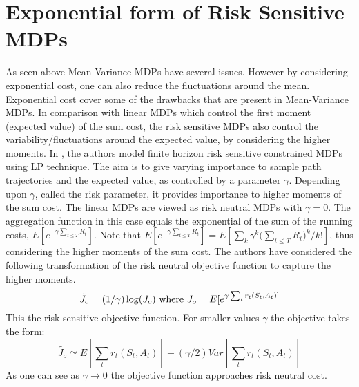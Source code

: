 \documentclass[11pt,a4paper,oneside]{report}
\begin{document}
\section{Exponential form of Risk Sensitive MDPs}
As seen above Mean-Variance MDPs have several issues. However by considering exponential cost, one can also reduce the fluctuations around the mean. Exponential cost cover some of the drawbacks that are present in Mean-Variance MDPs.
In comparison with linear MDPs which control the first moment (expected value) of the sum cost, the risk sensitive MDPs also control the variability/fluctuations around the expected value, by considering the higher moments. In \cite{kumar2015finite}, the authors model finite horizon risk sensitive constrained MDPs using LP technique.  The aim is to give varying importance to sample path trajectories and the expected value, as controlled by a parameter $\gamma$. Depending upon $\gamma$, called the risk parameter, it provides importance to higher moments of the sum cost. The linear MDPs are viewed as risk neutral MDPs with $\gamma=0$. The aggregation function in this case equals the exponential of the sum of the running costs, $E[e^{-\gamma {\sum_{t\leq T}R_t}} ]$. Note that $E[e^{-\gamma {\sum_{t\leq T}R_t}} ]= E[{\sum_k \gamma ^k {(\sum_{t\leq T}{R_t}})^{k}}/{k!}]$, thus considering the higher moments of the sum cost.
The authors have considered the following transformation of the risk neutral objective function to capture the higher moments.
\begin{equation*}
\tilde{J_o} = (1/\gamma)\log(J_o) \text{     where  }\\
J_o = E[e^{\gamma \sum_t r_t(S_t,A_t)]} 
\end{equation*}
This the risk sensitive objective function. For smaller values $\gamma$ the objective takes the form:
\begin{equation}
\tilde{J_o} \simeq E[ \sum_t r_t(S_t,A_t)] + (\gamma /2)Var[\sum_t r_t(S_t,A_t)] 
\end{equation} 
As one can see as $\gamma \rightarrow 0$ the objective function approaches risk neutral cost. 
\end{document}
